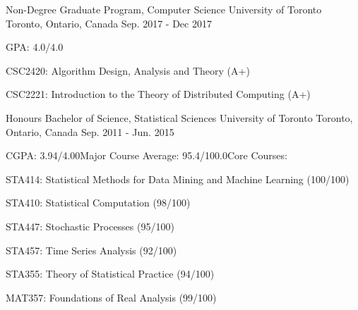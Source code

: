 
\begin{cventries}

  \cventry
    {Non-Degree Graduate Program, Computer Science} %
    {University of Toronto} %
    {Toronto, Ontario, Canada} %
    {Sep. 2017 - Dec 2017} %
    {GPA: 4.0/4.0\newline \hphantom{0}
      \begin{cvitems}
        \item {CSC2420: Algorithm Design, Analysis and Theory (A+)}
        \item {CSC2221: Introduction to the Theory of Distributed Computing (A+)}
      \end{cvitems}
    }
\end{cventries}
\begin{cventries}
  \cventry
    {Honours Bachelor of Science, Statistical Sciences} %
    {University of Toronto} %
    {Toronto, Ontario, Canada} %
    {Sep. 2011 - Jun. 2015} %
    {CGPA: 3.94/4.00\newline Major Course Average: 95.4/100.0\newline Core Courses: \newline \hphantom{0}
      \begin{cvitems}
        \item {STA414: Statistical Methods for Data Mining and Machine Learning (100/100)}
        \item {STA410: Statistical Computation (98/100)}
        \item {STA447: Stochastic Processes (95/100)}
        \item {STA457: Time Series Analysis (92/100)}
        \item {STA355: Theory of Statistical Practice (94/100)}
        \item {MAT357: Foundations of Real Analysis (99/100)}
      \end{cvitems}
    }
\end{cventries}
